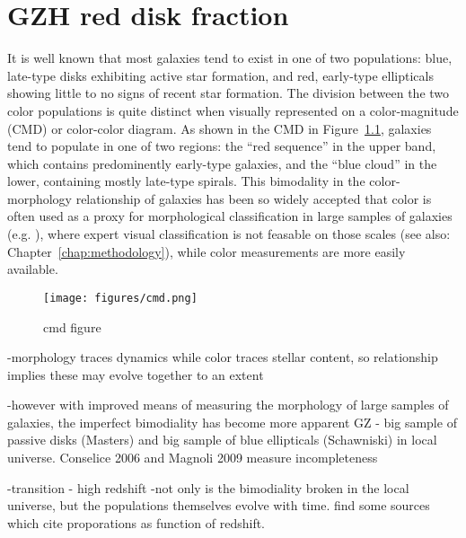
\chapter{GZH red disk fraction}
\label{chap:gzh_red_disks}

It is well known that most galaxies tend to exist in one of two populations: blue, late-type disks exhibiting active star formation, and red, early-type ellipticals showing little to no signs of recent star formation. The division between the two color populations is quite distinct when visually represented on a color-magnitude (CMD) or color-color diagram. As shown in the CMD in Figure~\ref{fig:CMD}, galaxies tend to populate in one of two regions: the ``red sequence'' in the upper band, which contains predominently early-type galaxies, and the ``blue cloud'' in the lower, containing mostly late-type spirals. This bimodality in the color-morphology relationship of galaxies has been so widely accepted that color is often used as a proxy for morphological classification in large samples of galaxies (e.g. \citet{Cooray2005,Lee2007,Salimbeni2008,Simon2009}), where expert visual classification is not feasable on those scales (see also: Chapter~\ref{chap:methodology}), while color measurements are more easily available. 

\begin{figure}
\centering
\texttt{[image: figures/cmd.png]}
\caption{cmd figure}
\label{fig:CMD}
\end{figure}

-morphology traces dynamics while color traces stellar content, so relationship implies these may evolve together to an extent

-however with improved means of measuring the morphology of large samples of galaxies, the imperfect bimodiality has become more apparent
GZ - big sample of passive disks (Masters) and big sample of blue ellipticals (Schawniski) in local universe. Conselice 2006 and Magnoli 2009 measure incompleteness

-transition - high redshift
-not only is the bimodiality broken in the local universe, but the populations themselves evolve with time. find some sources which cite proporations as function of redshift. 
